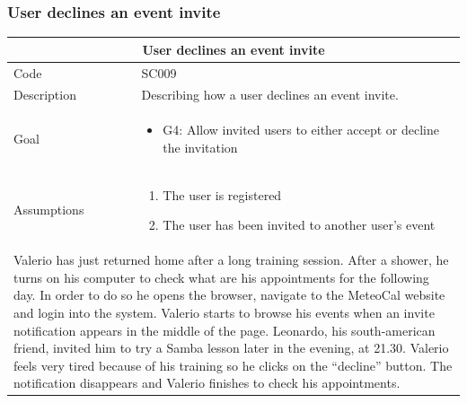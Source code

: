 \documentclass[10pt,a4paper,titlepage]{article}
\begin{document}
\subsubsection{User declines an event invite}
\begin{tabular}{| p{3cm} | p{10cm} |}
\hline \multicolumn{2}{|c|}{\textbf{User declines an event invite}} \\ 
\hline Code & SC009 \\ 
\hline Description & Describing how a user declines an event invite. \\
\hline Goal & \begin{itemize}\item G4: Allow invited users to either accept or decline the invitation\end{itemize}\\
\hline Assumptions & \begin{enumerate}
\item The user is registered
\item The user has been invited to another user's event
\end{enumerate} \\
\hline \multicolumn{2}{|p{13cm}|}{Valerio has just returned home after a long training session. After a shower, he turns on his computer to check what are his appointments for the following day. In order to do so he opens the browser, navigate to the MeteoCal website and login into the system. Valerio starts to browse his events when an invite notification appears in the middle of the page. Leonardo, his south-american friend, invited him to try a Samba lesson later in the evening, at 21.30. Valerio feels very tired because of his training so he clicks on the “decline” button. The notification disappears and Valerio finishes to check his appointments.}\\
\hline
\end{tabular}
\end{document}
